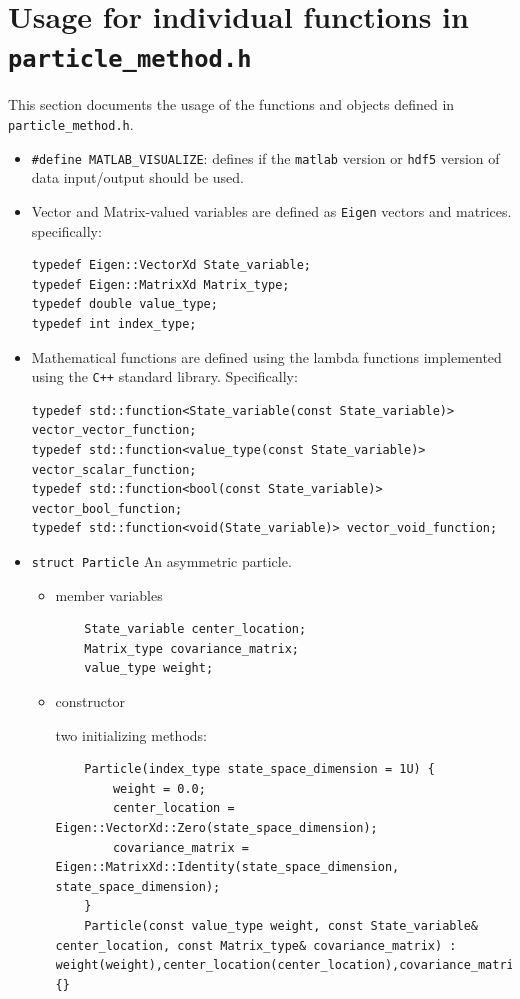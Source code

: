 \documentclass[10pt]{article} %
\begin{document}
\section{Usage for individual functions in \texttt{particle\_method.h}}
This section documents the usage of the functions and objects defined in \texttt{particle\_method.h}.
\begin{itemize}
\item
\texttt{\#define MATLAB\_VISUALIZE}: defines if the \texttt{matlab} version or \texttt{hdf5} version of data input/output should be used.
\item
Vector and Matrix-valued variables are defined as \texttt{Eigen} vectors and matrices. specifically: 
\begin{lstlisting}
typedef Eigen::VectorXd State_variable;
typedef Eigen::MatrixXd Matrix_type;
typedef double value_type;
typedef int index_type;
\end{lstlisting}
\item
Mathematical functions are defined using the lambda functions implemented using the \texttt{C++} standard library. Specifically: 
\begin{lstlisting}
typedef std::function<State_variable(const State_variable)> vector_vector_function;
typedef std::function<value_type(const State_variable)> vector_scalar_function;
typedef std::function<bool(const State_variable)> vector_bool_function;
typedef std::function<void(State_variable)> vector_void_function;
\end{lstlisting}
\item
\texttt{struct Particle} An asymmetric particle.
\begin{itemize}
\item
member variables

\begin{lstlisting}
	State_variable center_location;
	Matrix_type covariance_matrix;
	value_type weight;
\end{lstlisting}
\item
constructor

two initializing methods: 
\begin{lstlisting}
	Particle(index_type state_space_dimension = 1U) {
		weight = 0.0;
		center_location = Eigen::VectorXd::Zero(state_space_dimension);
		covariance_matrix = Eigen::MatrixXd::Identity(state_space_dimension, state_space_dimension);
	}
	Particle(const value_type weight, const State_variable& center_location, const Matrix_type& covariance_matrix) : weight(weight),center_location(center_location),covariance_matrix(covariance_matrix) {}
\end{lstlisting}


\end{itemize}
\end{itemize}
\end{document}
